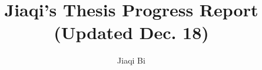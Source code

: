 \documentclass[preprint,12pt]{elsarticle}
\begin{document}
\begin{frontmatter}


\title{Jiaqi's Thesis Progress Report (Updated Dec. 18)}




\author[rvt]{Jiaqi Bi}

\address[rvt]{Western University, \\ Schulich School of Medicine \& Dentistry, \\ Department of Epidemiology and Biostatistics}





\end{frontmatter}
\end{document}
